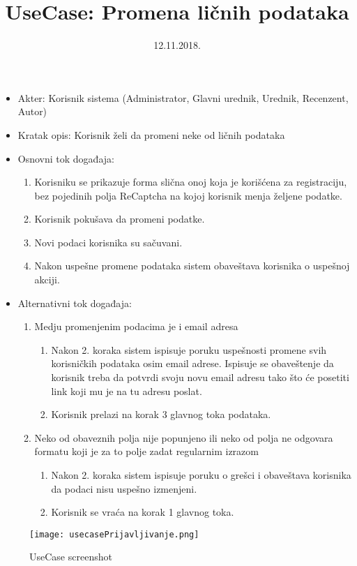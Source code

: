 \documentclass[a4paper]{article}
\title{UseCase: Promena ličnih podataka}
\date{12.11.2018.}
\begin{document}
\maketitle

\begin{itemize}
    \item Akter: Korisnik sistema (Administrator, Glavni urednik, Urednik, Recenzent, Autor)
    \item Kratak opis: Korisnik želi da promeni neke od ličnih podataka
    \item Osnovni tok događaja:
        \begin{enumerate}
            \item Korisniku se prikazuje forma slična onoj koja je korišćena za registraciju, bez pojedinih polja ReCaptcha na kojoj korisnik menja željene podatke.
            \item Korisnik pokušava da promeni podatke.
            \item Novi podaci korisnika su sačuvani.
            \item Nakon uspešne promene podataka sistem obaveštava korisnika o uspešnoj akciji.
        \end{enumerate}
    \item Alternativni tok događaja:
        \begin{enumerate}
            \item Medju promenjenim podacima je i email adresa
                \begin{enumerate}
                    \item Nakon 2. koraka sistem ispisuje poruku uspešnosti promene svih korisničkih podataka osim email adrese. Ispisuje se obaveštenje da korisnik treba da potvrdi svoju novu email adresu tako što će posetiti link koji mu je na tu adresu poslat.
                    \item Korisnik prelazi na korak 3 glavnog toka podataka.
                \end{enumerate}
            \item Neko od obaveznih polja nije popunjeno ili neko od polja ne odgovara formatu koji je za to polje zadat regularnim izrazom
                \begin{enumerate}
                    \item Nakon 2. koraka sistem ispisuje poruku o grešci i obaveštava korisnika da podaci nisu uspešno izmenjeni.
                    \item Korisnik se vraća na korak 1 glavnog toka.
                \end{enumerate}
        \end{enumerate}
\end{itemize}

\begin{figure}
    \centering
    \texttt{[image: usecasePrijavljivanje.png]}
    \caption{UseCase screenshot}
    \label{fig:my_label}
\end{figure}
\end{document}
